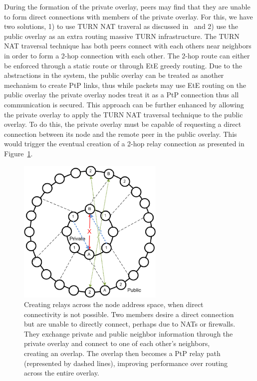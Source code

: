 \documentclass[conference]{IEEEtran}
\begin{document}
During the formation of the private overlay, peers may find that they are
unable to form direct connections with members of the private overlay.  For
this, we have two solutions, 1) to use TURN NAT traveral as discussed
in~\cite{nsdi10} and 2) use the public overlay as an extra routing massive TURN
infrastructure.  The TURN NAT traversal technique has both peers connect with
each others near neighbors in order to form a 2-hop connection with each other.
The 2-hop route can either be enforced through a static route or through EtE
greedy routing.  Due to the abstractions in the system, the public overlay can
be treated as another mechanism to create PtP links, thus while packets may use
EtE routing on the public overlay the private overlay nodes treat it as a PtP
connection thus all communication is secured.  This approach can be further
enhanced by allowing the private overlay to apply the TURN NAT traversal
technique to the public overlay.  To do this, the private overlay must be
capable of requesting a direct connection between its node and the remote
peer in the public overlay.  This would trigger the eventual creation of a 2-hop
relay connection as presented in Figure~\ref{fig:overlay_relay}.

\begin{figure}[h]
\centering
\includegraphics[width=2.75in]{subring_tunnel.eps}
\caption{Creating relays across the node address space, when direct
connectivity is not possible.  Two members desire a direct connection but are
unable to directly connect, perhaps due to NATs or firewalls.  They exchange
private and public neighbor information through the private overlay and connect
to one of each other's neighbors, creating an overlap.  The overlap then
becomes a PtP relay path (represented by dashed lines), improving performance
over routing across the entire overlay.}
\label{fig:overlay_relay}
\end{figure}
\end{document}
